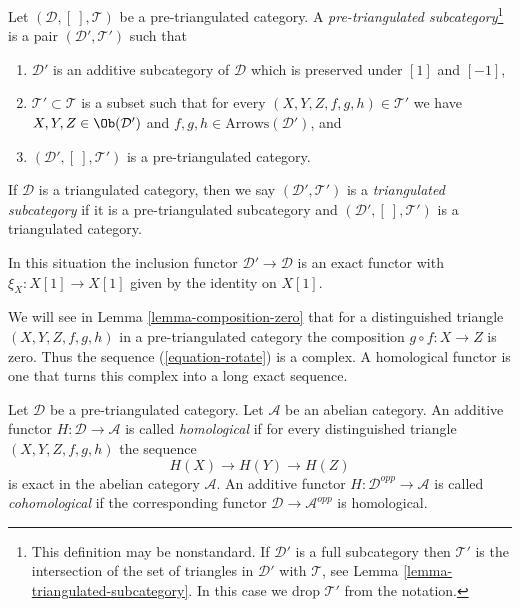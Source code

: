 \begin{definition}
\label{definition-triangulated-subcategory}
Let $(\mathcal{D}, [\ ], \mathcal{T})$ be a pre-triangulated category.
A {\it pre-triangulated subcategory}\footnote{This definition may be
nonstandard. If $\mathcal{D}'$ is a full subcategory then $\mathcal{T}'$
is the intersection of the set of triangles in $\mathcal{D}'$ with
$\mathcal{T}$, see
Lemma \ref{lemma-triangulated-subcategory}.
In this case we drop $\mathcal{T}'$ from the notation.}
is a pair $(\mathcal{D}', \mathcal{T}')$ such that
\begin{enumerate}
\item $\mathcal{D}'$ is an additive subcategory of $\mathcal{D}$
which is preserved under $[1]$ and $[-1]$,
\item $\mathcal{T}' \subset \mathcal{T}$ is a subset such that for every
$(X, Y, Z, f, g, h) \in \mathcal{T}'$ we have
$X, Y, Z \in \Ob(\mathcal{D}')$ and
$f, g, h \in \text{Arrows}(\mathcal{D}')$, and
\item $(\mathcal{D}', [\ ], \mathcal{T}')$ is a pre-triangulated
category.
\end{enumerate}
If $\mathcal{D}$ is a triangulated category, then we say
$(\mathcal{D}', \mathcal{T}')$ is a {\it triangulated subcategory} if
it is a pre-triangulated subcategory and
$(\mathcal{D}', [\ ], \mathcal{T}')$ is a triangulated category.
\end{definition}

\noindent
In this situation the inclusion functor
$\mathcal{D}' \to \mathcal{D}$ is an exact functor
with $\xi_X : X[1] \to X[1]$ given by the identity on $X[1]$.

\medskip\noindent
We will see in
Lemma \ref{lemma-composition-zero}
that for a distinguished triangle $(X, Y, Z, f, g, h)$
in a pre-triangulated category the composition $g \circ f : X \to Z$ is zero.
Thus the sequence (\ref{equation-rotate}) is a complex.
A homological functor is one that turns this complex into a long
exact sequence.

\begin{definition}
\label{definition-homological}
Let $\mathcal{D}$ be a pre-triangulated category.
Let $\mathcal{A}$ be an abelian category.
An additive functor $H : \mathcal{D} \to \mathcal{A}$ is called
{\it homological} if for every distinguished triangle
$(X, Y, Z, f, g, h)$ the sequence
$$
H(X) \to H(Y) \to H(Z)
$$
is exact in the abelian category $\mathcal{A}$. An additive functor
$H : \mathcal{D}^{opp} \to \mathcal{A}$ is called {\it cohomological}
if the corresponding functor $\mathcal{D} \to \mathcal{A}^{opp}$ is
homological.
\end{definition}

